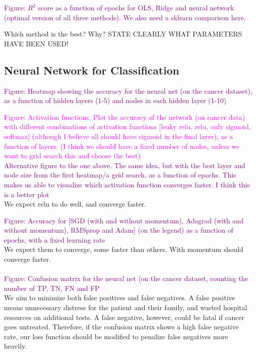 \textcolor{purple}{Figure: $R^2$ score as a function of epochs for OLS, Ridge and neural network (optimal version of all three methods). We also need a sklearn comparison here.}

Which method is the best? Why? STATE CLEARLY WHAT PARAMETERS HAVE BEEN USED!

\subsection{Neural Network for Classification}
\textcolor{purple}{Figure: Heatmap showing the accuracy for the neural net (on the cancer dataset), as a function of hidden layers (1-5) and nodes in each hidden layer (1-10)}


\textcolor{magenta}{Figure: Activation functions. Plot the accuracy of the network (on cancer data) with different combinations of activation functions [leaky relu, relu, only sigmoid, softmax] (although I believe all should have sigmoid in the final layer), as a function of layers. (I think we should have a fixed number of nodes, unless we want to grid search this and choose the best)} \\ 

\textcolor{purple}{Alternative figure to the one above. The same idea, but with the best layer and node size from the first heatmap/a grid search, as a function of epochs. This makes us able to visualize which activation function converges faster. I think this is a better plot} \\
We expect relu to do well, and converge faster. 

\textcolor{purple}{Figure: Accuracy for [SGD (with and without momentum), Adagrad (with and without momentum), RMSprop and Adam] (on the legend) as a function of epochs, with a fixed learning rate}
\\
We expect them to converge, some faster than others. With momentum should converge faster.
\\
\\
\textcolor{purple}{Figure: Confusion matrix for the neural net (on the cancer dataset, counting the number of TP, TN, FN and FP}
\\
We aim to minimize both false positives and false negatives. A false positive means unnecessary distress for the patient and their family, and wasted hospital resources on additional tests. A false negative, however, could be fatal if cancer goes untreated. Therefore, if the confusion matrix shows a high false negative rate, our loss function should be modified to penalize false negatives more heavily.

